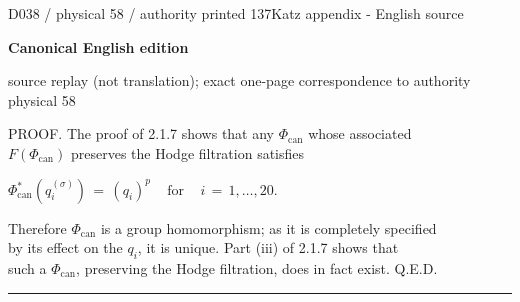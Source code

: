 \documentclass[9pt]{article}
\newcommand{\CanonText}[1]{\par{\fontsize{8.0}{9.35}\selectfont\RaggedRight #1\par}\vspace{2.2pt}}
\newcommand{\CanonDisplay}[1]{\par\vspace{1.2pt}\begin{center}{\fontsize{7.2}{8.4}\selectfont\(\displaystyle #1\)}\end{center}\vspace{1.2pt}}
\newcommand{\LayerTitle}{Canonical English edition}
\begin{document}
\noindent\begin{minipage}[t][\dimexpr\textheight-5pt\relax][t]{\textwidth}
{\sffamily\fontsize{7.3}{8.2}\selectfont\color{Quiet} D038 / physical 58 / authority printed 137\hfill Katz appendix - English source}
\par{}\vspace{4.5pt}
{\sffamily\fontsize{10.4}{11.6}\selectfont\bfseries\color{Accent} \LayerTitle}
\par{\sffamily\fontsize{6.7}{7.7}\selectfont\color{Quiet} source replay (not translation); exact one-page correspondence to authority physical 58}
\vspace{5pt}
\CanonText{PROOF. The proof of 2.1.7 shows that any \(\Phi{}_{\mathrm{can}}\) whose associated\\\(F(\Phi{}_{\mathrm{can}})\) preserves the Hodge filtration satisfies}
\CanonDisplay{\Phi{}_{\mathrm{can}}^{*}(q_{i}^{(\sigma{})})\,=\,(q_{i})^{p}\quad\,\text{for}\quad\,i\,=\,1,\ldots{},20.}
\CanonText{Therefore \(\Phi{}_{\mathrm{can}}\) is a group homomorphism; as it is completely specified\\by its effect on the \(q_{i}\), it is unique. Part (iii) of 2.1.7 shows that\\such a \(\Phi{}_{\mathrm{can}}\), preserving the Hodge filtration, does in fact exist. Q.E.D.}
\vfill
{\color{Accent}\hrule height 0.35pt}\vspace{3pt}
\end{minipage}
\end{document}
